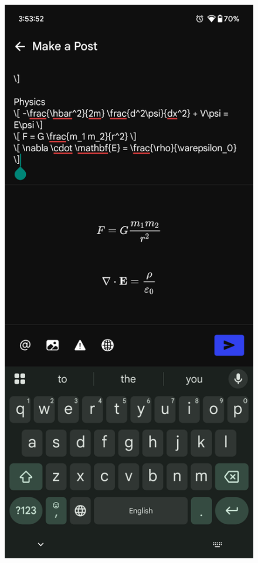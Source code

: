 \begin{figure}[htbp]
  \centering
  \begin{minipage}[b]{0.45\linewidth}
    \centering
    \includegraphics[width=\linewidth]{Graphics/writingpost.png}

\end{minipage}
\end{figure}
